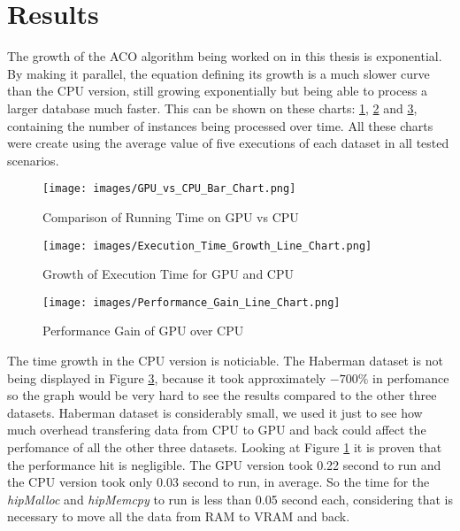 \section{Results} \label{Results}

The growth of the ACO algorithm being worked on in this thesis is exponential.
By making it parallel, the equation defining its growth is a much slower curve than the CPU version,
still growing exponentially but being able to process a larger database much faster.
This can be shown on these charts: \ref{fig:gpu_vs_cpu}, \ref{fig:execution_time_growth} and
\ref{fig:performance_gain}, containing the number of instances being processed over time. All these charts
were create using the average value of five executions of each dataset in all tested scenarios.

\begin{figure}[h!]
    \centering
    \texttt{[image: images/GPU\_vs\_CPU\_Bar\_Chart.png]}
    \caption{Comparison of Running Time on GPU vs CPU}
    \label{fig:gpu_vs_cpu}
\end{figure}

\begin{figure}[h!]
    \centering
    \texttt{[image: images/Execution\_Time\_Growth\_Line\_Chart.png]}
    \caption{Growth of Execution Time for GPU and CPU}
    \label{fig:execution_time_growth}
\end{figure}

\begin{figure}[h!]
    \centering
    \texttt{[image: images/Performance\_Gain\_Line\_Chart.png]}
    \caption{Performance Gain of GPU over CPU}
    \label{fig:performance_gain}
\end{figure}

The time growth in the CPU version is noticiable.
The Haberman dataset is not being displayed in Figure \ref{fig:performance_gain}, because it took approximately $-700\%$
in perfomance so the graph would be very hard to see the results compared to the other three datasets.
Haberman dataset is considerably small, we used it just to see how much overhead transfering data from CPU to GPU and back
could affect the perfomance of all the other three datasets. Looking at Figure \ref{fig:gpu_vs_cpu} it is proven that
the performance hit is negligible. The GPU version took 0.22 second to run and the CPU version took only
0.03 second to run, in average. So the time for the \emph{hipMalloc} and \emph{hipMemcpy} to run is less than 0.05 second each,
considering that is necessary to move all the data from RAM to VRAM and back.
